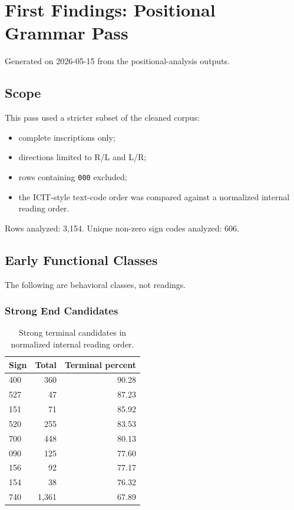 \section{First Findings: Positional Grammar Pass}

Generated on 2026-05-15 from the positional-analysis outputs.

\subsection{Scope}

This pass used a stricter subset of the cleaned corpus:

\begin{itemize}
  \item complete inscriptions only;
  \item directions limited to R/L and L/R;
  \item rows containing \texttt{000} excluded;
  \item the ICIT-style text-code order was compared against a normalized internal reading order.
\end{itemize}

Rows analyzed: 3,154. Unique non-zero sign codes analyzed: 606.

\subsection{Early Functional Classes}

The following are behavioral classes, not readings.

\subsubsection{Strong End Candidates}

\begin{table}[htbp]
\centering
\begin{tabular}{lrr}
\toprule
\textbf{Sign} & \textbf{Total} & \textbf{Terminal percent} \\
\midrule
400 & 360 & 90.28 \\
527 & 47 & 87.23 \\
151 & 71 & 85.92 \\
520 & 255 & 83.53 \\
700 & 448 & 80.13 \\
090 & 125 & 77.60 \\
156 & 92 & 77.17 \\
154 & 38 & 76.32 \\
740 & 1,361 & 67.89 \\
\bottomrule
\end{tabular}
\caption{Strong terminal candidates in normalized internal reading order.}
\label{tab:terminal-candidates}
\end{table}

